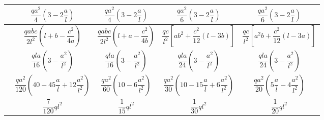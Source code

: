 \begin{table}[H]
{\begin{tabular}{m{4cm}cccc}
         & $\dfrac{qa^2}{4}\left(3-2\dfrac{a}{l}\right)$ & $\dfrac{qa^2}{4}\left(3-2\dfrac{a}{l}\right)$ & $\dfrac{qa^2}{6}\left(3-2\dfrac{a}{l}\right)$ & $\dfrac{qa^2}{6}\left(3-2\dfrac{a}{l}\right)$ \\ \midrule
         & $\dfrac{qabc}{2l^2}\left(l+b-\dfrac{c^2}{4a}\right)$ & $\dfrac{qabc}{2l^2}\left(l+a-\dfrac{c^2}{4b}\right)$ & $\dfrac{qc}{l^2}\left[ab^2+\dfrac{c^2}{12}\left(l-3b\right)\right]$ & $\dfrac{qc}{l^2}\left[a^2b+\dfrac{c^2}{12}\left(l-3a\right)\right]$ \\ \midrule
         & $\dfrac{qla}{16}\left(3-\dfrac{a^2}{l^2}\right)$ & $\dfrac{qla}{16}\left(3-\dfrac{a^2}{l^2}\right)$ & $\dfrac{qla}{24}\left(3-\dfrac{a^2}{l^2}\right)$ & $\dfrac{qla}{24}\left(3-\dfrac{a^2}{l^2}\right)$ \\ \midrule
         & $\dfrac{qa^2}{120}\left(40-45\dfrac{a}{l}+12\dfrac{a^2}{l^2}\right)$ & $\dfrac{qa^2}{60}\left(10-6\dfrac{a^2}{l^2}\right)$ & $\dfrac{qa^2}{30}\left(10-15\dfrac{a}{l}+6\dfrac{a^2}{l^2}\right)$ & $\dfrac{qa^2}{20}\left(5\dfrac{a}{l}-4\dfrac{a^2}{l^2}\right)$ \\ \midrule
         & $\dfrac{7}{120}ql^2$ & $\dfrac{1}{15}ql^2$ & $\dfrac{1}{30}ql^2$ & $\dfrac{1}{20}ql^2$ \\ \midrule
    \end{tabular}
	} %
    \label{tab:my_label}
\end{table}
